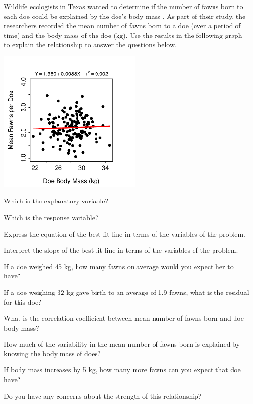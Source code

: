\documentclass[10pt,openany]{book}\usepackage[]{graphicx}\usepackage[]{color}
\begin{document}
\begin{exsection}
  \item \label{revex:RegFawns2} Wildlife ecologists in Texas wanted to determine if the number of fawns born to each doe could be explained by the doe's body mass \citep{GinnettYoung2000}.  As part of their study, the researchers recorded the mean number of fawns born to a doe (over a period of time) and the body mass of the doe (kg).  Use the results in the following graph to explain the relationship to answer the questions below. 

\begin{center}
  \includegraphics[width=2.8in]{Figs/Deer2FLP-1}
\end{center}
    \begin{Enumerate}
      \item Which is the explanatory variable?
      \item Which is the response variable?
      \item Express the equation of the best-fit line in terms of the variables of the problem.
      \item Interpret the slope of the best-fit line in terms of the variables of the problem.
      \item If a doe weighed 45 kg, how many fawns on average would you expect her to have?
      \item If a doe weighing 32 kg gave birth to an average of 1.9 fawns, what is the residual for this doe?
      \item What is the correlation coefficient between mean number of fawns born and doe body mass?
      \item How much of the variability in the mean number of fawns born is explained by knowing the body mass of does?
      \item If body mass increases by 5 kg, how many more fawns can you expect that doe have?
      \item Do you have any concerns about the strength of this relationship?
    \end{Enumerate}

\end{exsection}
\end{document}
